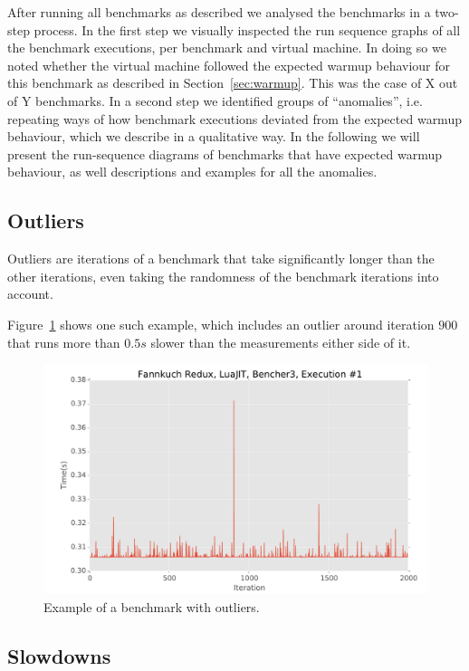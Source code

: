\documentclass[a4paper,UKenglish]{lipics}
\begin{document}
After running all benchmarks as described we analysed the benchmarks in a
two-step process. In the first step we visually inspected the run sequence
graphs of all the benchmark executions, per benchmark and virtual machine. In
doing so we noted whether the virtual machine followed the expected warmup
behaviour for this benchmark as described in Section~\ref{sec:warmup}. This was
the case of  X out of Y benchmarks. In a second step we
identified groups of ``anomalies'', i.e. repeating ways of how benchmark
executions deviated from the expected warmup behaviour, which we describe in a
qualitative way. In the following we will
present the run-sequence diagrams of benchmarks that have expected warmup
behaviour, as well descriptions and examples for all the anomalies.



\subsection{Outliers}
\label{sub:outliers}

Outliers are iterations of a benchmark that take significantly longer than the
other iterations, even taking the randomness of the benchmark iterations into
account.

Figure~\ref{fig:examples:outliers1} shows one such example, which includes an
outlier around iteration $900$ that runs more than $0.5s$ slower than the
measurements either side of it.

\begin{figure}[h!]
\centering
\includegraphics[width=.46\textwidth]{examples/outliers1}
\caption{Example of a benchmark with outliers.}
\label{fig:examples:outliers1}
\end{figure}


\subsection{Slowdowns}
\label{sub:slowdowns}

\end{document}
